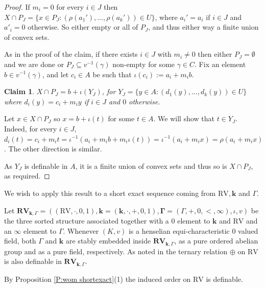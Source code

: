 \documentclass[11pt]{amsart}
\newtheorem{claim}{Claim}[theorem]
\theoremstyle{definition}
\newcommand{\bk}{\textbf{k}}
\newcommand{\0}{\emptyset}
\newenvironment{claimproof}[1][\proofname]
{%
	\proof[#1]%
	\renewcommand*\qedsymbol{$\square$ (claim)}%
}
{%
	\endproof%
}
\begin{document}
\begin{proof}

        If $m_i=0$ for every $i\in J$ then $X\cap P_J=\{x\in P_J: (\rho(a_1'),\dots,\rho(a_k'))\in U\}$, where $a_i'=a_i$ if $i\in J$ and $a'_i=0$ otherwise. So either empty or all of $P_J$, and thus either way a finite union of convex sets.

        As in the proof of the claim, if there exists $i\in J$ with $m_i\neq 0$ then either $P_J=\emptyset$ and we are done or $P_J\subseteq v^{-1}(\gamma)$ non-empty for some $\gamma\in C$. Fix an element $b\in v^{-1}(\gamma)$, and let $c_i\in A$ be such that $\iota(c_i):=a_i+m_ib$.
        \begin{claim}
            $X\cap P_J=b+\iota(Y_J)$, for $Y_J=\{y\in A:(d_1(y),\dots,d_k(y))\in U\}$ where $d_i(y)=c_i+m_iy$ if $i\in J$ and $0$ otherwise.
        \end{claim}
        \begin{claimproof}
            Let $x\in X\cap P_J$ so $x=b+\iota(t)$ for some $t\in A$. We will show that $t\in Y_J$. Indeed, for every $i\in J$, $d_i(t)=c_i+m_it=\iota^{-1}(a_i+m_ib+m_i\iota(t))=\iota^{-1}(a_i+m_ix)=\rho(a_i+m_ix)$. The other direction is similar.
        \end{claimproof}

        As $Y_J$ is definable in $A$, it is a finite union of convex sets and thus so is $X\cap P_J$, as required.
    \end{proof}

        We wish to apply this result to a short exact sequence coming from $\mathrm{RV}, \bk$ and $\Gamma$.

    Let $\mathbf{RV}_{\bk,\Gamma}=((\mathrm{RV},\cdot, 0,1),\bk=(\bk,\cdot,+,0,1),\mathbf{\Gamma}=(\Gamma,+,0,<,\infty),\iota,v)$ be the three sorted structure associated  together with a $0$ element to $\bk$ and $\mathrm{RV}$ and an $\infty$ element to $\Gamma$. 
     Whenever $(K,v)$ is a henselian equi-characteristic $0$ valued field, both $\Gamma$ and $\bk$ are stably embedded inside $\mathbf{RV}_{\bk,\Gamma}$, as a pure ordered abelian group and as a pure field, respectively. As noted in \cite[\S 3]{ChSi:inp} the ternary relation $\oplus$ on $\mathrm{RV}$ is also definable in $\mathbf{RV}_{\bk, \Gamma}$.
    
    
    By Proposition \ref{P:wom shortexact}(1) the induced order on $\mathrm{RV}$ is definable.
\end{document}

